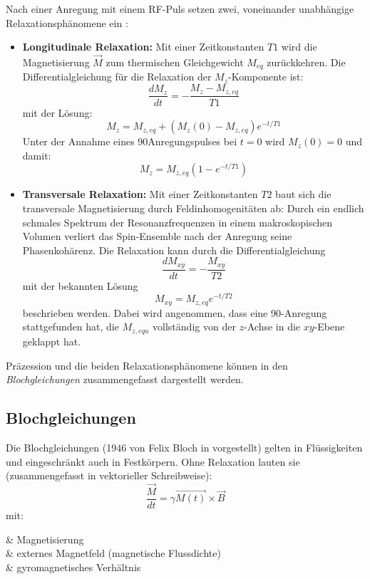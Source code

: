Nach einer Anregung mit einem RF-Puls setzen zwei, voneinander unabhängige Relaxationsphänomene ein \cite{Nishimura1996}:
\begin{itemize}
	\item \textbf{Longitudinale Relaxation:} Mit einer Zeitkonstanten $T1$ wird die Magnetisierung $\vec{M}$ zum thermischen Gleichgewicht $M_{eq}$ zurückkehren. Die Differentialgleichung für die Relaxation der $M_z$-Komponente ist:
	\begin{equation}
		\frac{dM_z}{dt}=-\frac{M_z-M_{z,eq}}{T1}
	\end{equation}
	mit der Lösung:
	\begin{equation}
		M_z=M_{z,eq}+\left(M_z(0)-M_{z,eq}\right) e^{-t/T1}
	\end{equation}
	Unter der Annahme eines 90\degree Anregungspulses bei $t=0$ wird $M_z(0)=0$ und damit:
	\begin{equation}
		M_z=M_{z,eq}\left(1-e^{-t/T1}\right)
	\end{equation}
	\item \textbf{Transversale Relaxation:} Mit einer Zeitkonstanten $T2$ baut sich die transversale Magnetisierung durch Feldinhomogenitäten ab: Durch ein endlich schmales Spektrum der Resonanzfrequenzen in einem makroskopischen Volumen verliert das Spin-Ensemble nach der Anregung seine Phasenkohärenz. Die Relaxation kann durch die Differentialgleichung
	\begin{equation}
		\frac{dM_{xy}}{dt}=-\frac{M_{xy}}{T2}
	\end{equation}
	mit der bekannten Lösung
	\begin{equation}
		M_{xy}=M_{z,eq} e^{-t/T2}
	\end{equation}
	beschrieben werden. Dabei wird angenommen, dass eine 90\degree-Anregung stattgefunden hat, die $M_{z,equ}$ vollständig von der $z$-Achse in die $xy$-Ebene geklappt hat.
\end{itemize}

Präzession und die beiden Relaxationsphänomene können in den \textit{Blochgleichungen} zusammengefasst dargestellt werden.

\subsection{Blochgleichungen}
Die Blochgleichungen (1946 von Felix Bloch in \cite{Bloch1946} vorgestellt) gelten in Flüssigkeiten und eingeschränkt auch in Festkörpern. 
Ohne Relaxation lauten sie (zusammengefasst in vektorieller Schreibweise):
\begin{equation}
\label{eq:bloch1}
	\frac{\vec{M}}{dt} = \gamma \vec{M(t)} \times \vec{B}
\end{equation}
mit:
\begin{with*}
	 & Magnetisierung \\
	 & externes Magnetfeld (magnetische Flussdichte) \\
	\gamma & gyromagnetisches Verhältnis \\
\end{with*}

